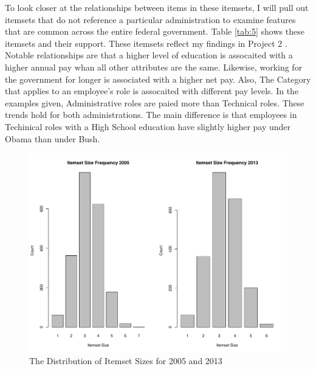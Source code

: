 \documentclass{article}
\begin{document}
    To look closer at the relationships between items in these itemsets, I will pull out itemsets that do not reference a particular administration to examine features that are common across the entire federal government. Table \ref{tab:5} shows these itemsets and their support. These itemsets reflect my findings in Project 2 \cite{proj2}. Notable relationships are that a higher level of education is assocaited with a higher annual pay whan all other attributes are the same. Likewise, working for the government for longer is associated with a higher net pay. Also, The Category that applies to an employee's role is assocaited with different pay levels. In the examples given, Administrative roles are paied more than Technical roles. These trends hold for both administrations. The main difference is that employees in Techinical roles with a High School education have slightly higher pay under Obama than under Bush.

    \begin{center}
        \begin{figure}
            \includegraphics[scale=0.4]{./images/freq-itemset-sizes.pdf}
            \caption{The Distribution of Itemset Sizes for 2005 and 2013}
            \label{fig:1}
        \end{figure}
    \end{center}
\end{document}
